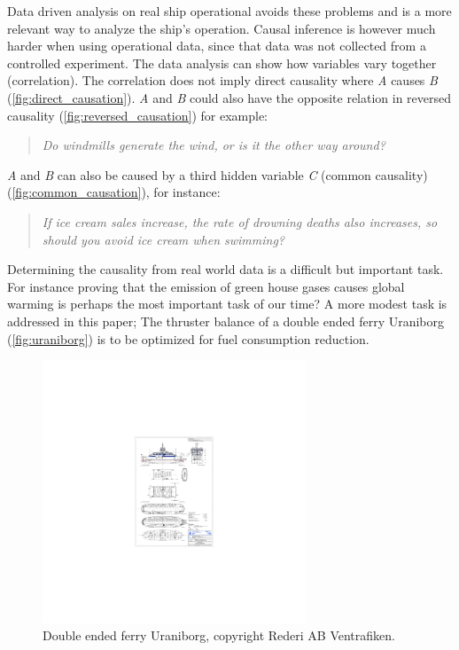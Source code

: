 \documentclass[fleqn,10pt]{olplainarticle}
\begin{document}
Data driven analysis on real ship operational avoids these problems and is a more relevant way to analyze the ship's operation. Causal inference is however much harder when using operational data, since that data was not collected from a controlled experiment. The data analysis can show how variables vary together (correlation). The correlation does not imply direct causality where \emph{A} causes \emph{B} (\autoref{fig:direct_causation}). \emph{A} and \emph{B} could also have the opposite relation in reversed causality (\autoref{fig:reversed_causation}) for example:
\begin{quote}
\emph{Do windmills generate the wind, or is it the other way around?}
\end{quote}
\emph{A} and \emph{B} can also be caused by a third hidden variable \emph{C} (common causality) (\autoref{fig:common_causation}), for instance:
\begin{quote}
\emph{If ice cream sales increase, the rate of drowning deaths also increases, so should you avoid ice cream when swimming?}
\end{quote}

Determining the causality from real world data is a difficult but important task. For instance proving that the emission of green house gases causes global warming is perhaps the most important task of our time? A more modest task is addressed in this paper; The thruster balance of a double ended ferry Uraniborg (\autoref{fig:uraniborg}) is to be optimized for fuel consumption reduction. 
\begin{figure}[!htb]
    \centering
    \includegraphics[width=0.7\textwidth]{figures/GA_uraniborg.pdf}
    \caption{Double ended ferry Uraniborg, copyright Rederi AB Ventrafiken.}
    \label{fig:uraniborg}
\end{figure}
\end{document}
